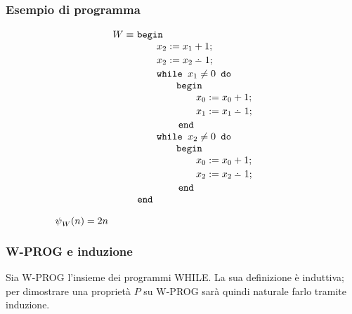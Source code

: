 \subsubsection*{Esempio di programma}
\vspace{-1em}
\begin{minipage}{.34\textwidth}
    \begin{align}
        W \equiv\ & \textbegin                      \notag\\[-.3em]
        & \qquad x_2 := x_1+1;                      \notag\\[-.3em]
        & \qquad x_2 := x_2\dotminus 1;             \notag\\[-.3em]
        & \qquad \while{x_1}                        \notag\\[-.3em]
        & \qquad\qquad \textbegin                   \notag\\[-.3em]
        & \qquad\qquad\qquad x_0 := x_0+1;          \notag\\[-.3em]
        & \qquad\qquad\qquad x_1 := x_1\dotminus 1; \notag\\[-.3em]
        & \qquad\ \ \ \ \ \textend                  \notag\\[-.3em]
        & \qquad \while{x_2}                        \notag\\[-.3em]
        & \qquad\qquad \textbegin                   \notag\\[-.3em]
        & \qquad\qquad\qquad x_0 := x_0+1;          \notag\\[-.3em]
        & \qquad\qquad\qquad x_2 := x_2\dotminus 1; \notag\\[-.3em]
        & \qquad\ \ \ \ \ \textend                  \notag\\[-.3em]
        & \hspace{-.5em}\textend                            \notag
    \end{align}
\end{minipage} \hspace{1em}
\begin{minipage}{.6\textwidth}
    $\qquad\qquad\ \ \ \semanticaWHILE_W(n) = 2n $
\end{minipage}

\subsubsection*{W-PROG e induzione}
Sia W-PROG l'insieme dei programmi WHILE. La sua definizione è induttiva; per dimostrare
una proprietà $P$ su W-PROG sarà quindi naturale farlo tramite induzione.

